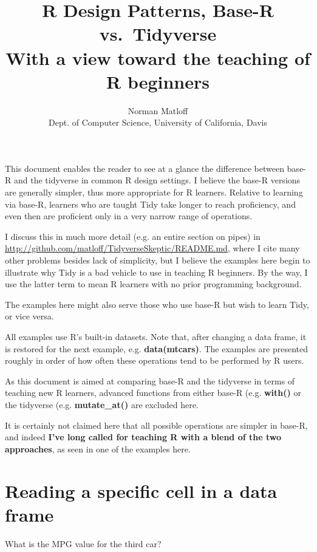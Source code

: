 \documentclass[11pt]{article}
\title{R Design Patterns, Base-R vs.\ Tidyverse \\
   With a view toward the teaching of R beginners}
\author{Norman Matloff \\
      Dept. of Computer Science, University of California, Davis}
\begin{document}
\maketitle

This document enables the reader to see at a glance the difference
between base-R and the tidyverse in common R design settings.  I believe
the base-R versions are generally simpler, thus more appropriate for R
learners.  Relative to learning via base-R, learners who are taught Tidy
take longer to reach proficiency, and even then are proficient only in a
very narrow range of operations.

I discuss this in much more detail (e.g. an entire section on
pipes) in \url{http://github.com/matloff/TidyverseSkeptic/README.md},
where I cite many other problems besides lack of simplicity, but I
believe the examples here begin to illustrate why Tidy is a bad vehicle
to use in teaching R beginners.  By the way, I use the latter term to
mean R learners with no prior programming background.

The examples here might also serve those who use base-R but wish to
learn Tidy, or vice versa.

All examples use R's built-in datasets.  Note that, after changing a data
frame, it is restored for the next example, e.g. \textbf{data(mtcars)}.
The examples are presented roughly in order of how often these
operations tend to be performed by R users.

As this document is aimed at comparing base-R and the tidyverse in terms
of teaching new R learners, advanced functions from either base-R (e.g.
\textbf{with()} or the tidyverse (e.g. \textbf{mutate\_at()} are excluded
here.

It is certainly not claimed here that all possible operations are
simpler in base-R, and indeed \textbf{ I've long called for teaching R
with a blend of the two approaches}, as seen in one of the examples
here.  

\section*{Reading a specific cell in a data frame}

What is the MPG value for the third car? 
\end{document}
